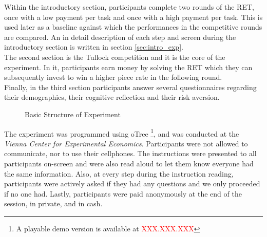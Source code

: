    Within the introductory section, participants complete two rounds of the RET, once with a low payment per task and once with a high payment per task. This is used later as a baseline against which the performances in the competitive rounds are compared. An in detail description of each step and screen during the introductory section is written in section \ref{sec:intro_exp}.\\
    
    The second section is the Tullock competition and it is the core of the experiment. In it, participants earn money by solving the RET which they can subsequently invest to win a higher piece rate in the following round.\\
    
    Finally, in the third section participants answer several questionnaires regarding their demographics, their cognitive reflection and their risk aversion.\\
    
    \begin{figure}
\centering
{}

\caption{Basic Structure of Experiment}
\label{fig:exp_str}
\end{figure}
    
    The experiment was programmed using oTree \citep{chen2016}\footnote{A playable demo version is available at \textcolor{red}{XXX.XXX.XXX}}, and was conducted at the \textit{Vienna Center for Experimental Economics}. Participants were not allowed to communicate, nor to use their cellphones. The instructions were presented to all participants on-screen and were also read aloud to let them know everyone had the same information. Also, at every step during the instruction reading, participants were actively asked if they had any questions and we only proceeded if no one had. Lastly, participants were paid anonymously at the end of the session, in private, and in cash.
    
